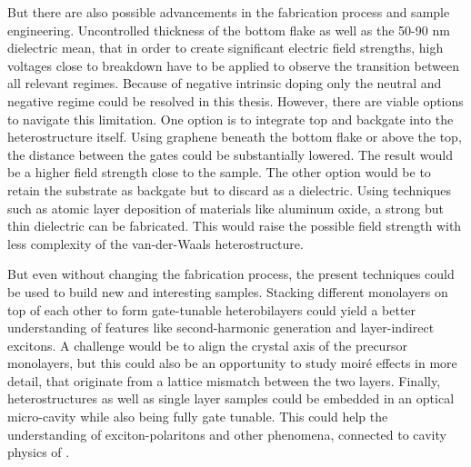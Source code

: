 But there are also possible advancements in the fabrication process and sample engineering. Uncontrolled thickness of the bottom \hbng flake as well as the 50-90 nm \sio dielectric mean, that in order to create significant electric field strengths, high voltages close to breakdown have to be applied to observe the transition between all relevant regimes. Because of negative intrinsic doping only the neutral and negative regime could be resolved in this thesis. However, there are viable options to navigate this limitation. One option is to integrate top and backgate into the heterostructure itself. Using graphene beneath the bottom \hbng flake or above the top, the distance between the gates could be substantially lowered. The result would be a higher field strength close to the sample. The other option would be to retain the substrate as backgate but to discard \sio as a dielectric. Using techniques such as atomic layer deposition of materials like aluminum oxide, a strong but thin dielectric can be fabricated. This would raise the possible field strength with less complexity of the van-der-Waals heterostructure.

But even without changing the fabrication process, the present techniques could be used to build new and interesting samples. Stacking different \tmdg monolayers on top of each other to form gate-tunable heterobilayers could yield a better understanding of features like second-harmonic generation and layer-indirect excitons. A challenge would be to align the crystal axis of the precursor monolayers, but this could also be an opportunity to study moiré effects in more detail, that originate from a lattice mismatch between the two layers.
Finally, heterostructures as well as single layer samples could be embedded in an optical micro-cavity while also being fully gate tunable. This could help the understanding of exciton-polaritons and other phenomena, connected to cavity physics of \tmds.